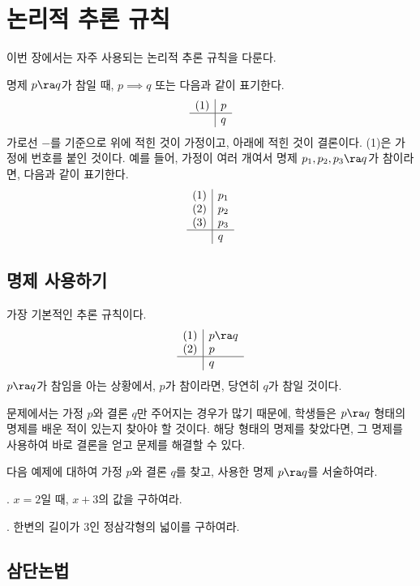 \chapter{논리적 추론 규칙}

이번 장에서는 자주 사용되는 논리적 추론 규칙을 다룬다.

명제 \(p \ra q\)가 참일 때, \(p \implies q\) 또는 다음과 같이 표기한다.
\[
    \begin{array}{c|l}
        (1) & p \\\hline & q
    \end{array}
\]
가로선 \(-\)를 기준으로 위에 적힌 것이 가정이고, 아래에 적힌 것이 결론이다. (1)은 가정에 번호를 붙인 것이다. 예를 들어, 가정이 여러 개여서 명제 \(p_1, p_2, p_3 \ra q\)가 참이라면, 다음과 같이 표기한다.
\[
    \begin{array}{c|l}
        (1) & p_1 \\ (2) & p_2 \\ (3) & p_3 \\\hline & q
    \end{array}
\]

\pagebreak

\section{명제 사용하기}

가장 기본적인 추론 규칙이다.
\[
    \begin{array}{c|l}
        (1) & p \ra q \\ (2) & p \\\hline & q
    \end{array}
\]
\(p \ra q\)가 참임을 아는 상황에서, \(p\)가 참이라면, 당연히 \(q\)가 참일 것이다.

문제에서는 가정 \(p\)와 결론 \(q\)만 주어지는 경우가 많기 때문에, 학생들은 \(p \ra q\) 형태의 명제를 배운 적이 있는지 찾아야 할 것이다. 해당 형태의 명제를 찾았다면, 그 명제를 사용하여 바로 결론을 얻고 문제를 해결할 수 있다.

\bigskip

다음 예제에 대하여 가정 \(p\)와 결론 \(q\)를 찾고, 사용한 명제 \(p \ra q\)를 서술하여라.

\ex. \(x = 2\)일 때, \(x + 3\)의 값을 구하여라.

\vspace*{250px}

\ex. 한변의 길이가 3인 정삼각형의 넓이를 구하여라.

\pagebreak

\section{삼단논법}

